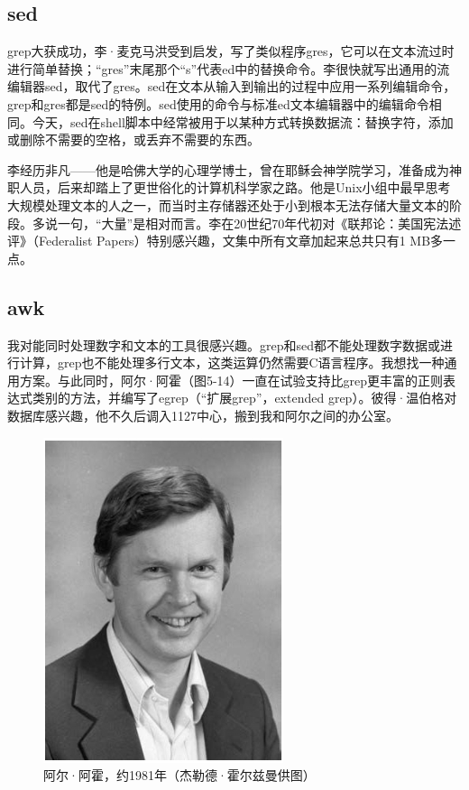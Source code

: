 \documentclass[a4paper,12pt,UTF8,twoside]{ctexbook}
\begin{document}
\subsection{sed}

grep大获成功，李·麦克马洪受到启发，写了类似程序gres，它可以在文本流过时进行简单替换；“gres”末尾那个“s”代表ed中的替换命令。李很快就写出通用的流编辑器sed，取代了gres。sed在文本从输入到输出的过程中应用一系列编辑命令，grep和gres都是sed的特例。sed使用的命令与标准ed文本编辑器中的编辑命令相同。今天，sed在shell脚本中经常被用于以某种方式转换数据流：替换字符，添加或删除不需要的空格，或丢弃不需要的东西。

李经历非凡——他是哈佛大学的心理学博士，曾在耶稣会神学院学习，准备成为神职人员，后来却踏上了更世俗化的计算机科学家之路。他是Unix小组中最早思考大规模处理文本的人之一，而当时主存储器还处于小到根本无法存储大量文本的阶段。多说一句，“大量”是相对而言。李在20世纪70年代初对《联邦论：美国宪法述评》（Federalist Papers）特别感兴趣，文集中所有文章加起来总共只有1 MB多一点。

\subsection{awk}

我对能同时处理数字和文本的工具很感兴趣。grep和sed都不能处理数字数据或进行计算，grep也不能处理多行文本，这类运算仍然需要C语言程序。我想找一种通用方案。与此同时，阿尔·阿霍（图5-14）一直在试验支持比grep更丰富的正则表达式类别的方法，并编写了egrep（“扩展grep”，extended grep）。彼得·温伯格对数据库感兴趣，他不久后调入1127中心，搬到我和阿尔之间的办公室。

\begin{figure}[htbp]
	\centering
	\includegraphics[width=0.7\linewidth]{53}
	\caption{阿尔·阿霍，约1981年（杰勒德·霍尔兹曼供图）}
	\label{fig:1}
\end{figure}
\end{document}
